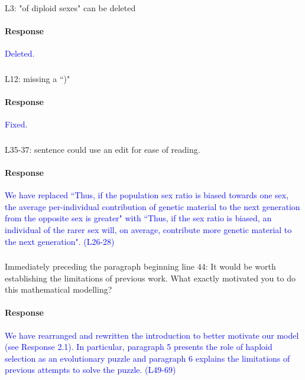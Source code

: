 \documentclass[10pt,letterpaper]{article}
\begin{document}
\noindent\subsubsection{}
L3: "of diploid sexes" can be deleted

\noindent\paragraph{Response}
\textcolor{blue}{Deleted.}

\noindent\subsubsection{}
L12: missing a ``)"

\noindent\paragraph{Response}
\textcolor{blue}{Fixed.}

\noindent\subsubsection{}
L35-37: sentence could use an edit for ease of reading.

\noindent\paragraph{Response}
\textcolor{blue}{We have replaced ``Thus, if the population sex ratio is biased towards one sex, the average per-individual contribution of genetic material to the next generation from the opposite sex is greater" with ``Thus, if the sex ratio is biased, an individual of the rarer sex will, on average, contribute more genetic material to the next generation". (L26-28)}

\noindent\subsubsection{}
Immediately preceding the paragraph beginning line 44: It would be worth establishing the limitations of previous work. What exactly motivated you to do this mathematical modelling?

\noindent\paragraph{Response}
\textcolor{blue}{We have rearranged and rewritten the introduction to better motivate our model (see Response 2.1). In particular, paragraph 5 presents the role of haploid selection as an evolutionary puzzle and paragraph 6 explains the limitations of previous attempts to solve the puzzle. (L49-69)}
\end{document}
